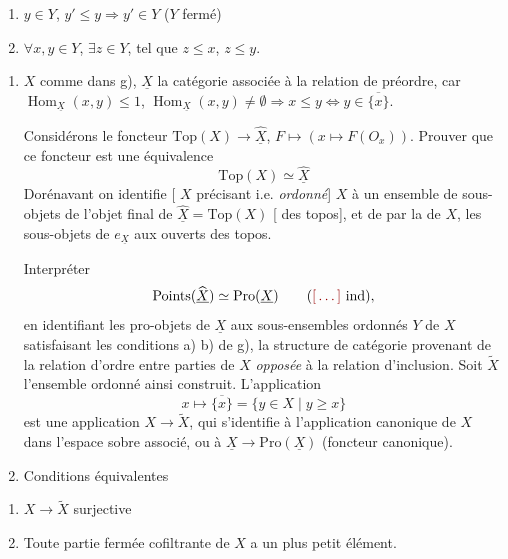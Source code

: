 \documentclass[11pt,a4paper]{article}
\begin{document}
\begin{enumerate}
\item[a)] $y \in Y$, $y' \leq y \Rightarrow y' \in Y$ \quad ($Y$ fermé)
\item[b)] $\forall x,y \in Y$, $\exists z \in Y$, tel que $z \leq x$, $z \leq y$.
\end{enumerate}


\begin{enumerate}
\item[h)] $X$ comme dans g), $\underline{X}$ la catégorie associée à la relation
de préordre, car $\operatorname{Hom}_{\underline{X}}(x,y) \leq 1$,
$\operatorname{Hom}_{\underline{X}}(x,y) \neq \emptyset \Rightarrow x \leq y
\iff y \in \overline{\{x\}}$.

Considérons le foncteur $\mathrm{Top}(X) \to \widehat{\underline{X}}$,
$F \mapsto (x \mapsto F(O_{x}))$. Prouver que ce foncteur est une équivalence
\[
\mathrm{Top}(X) \simeq \widehat{\underline{X}}
\]
Dorénavant on identifie [ $X$ précisant i.e. \emph{ordonné}] $X$ à un
ensemble de sous-objets de l'objet final de
$\widehat{\underline{X}} = \mathrm{Top}(X)$ [ \ill{} des topos],
et de \ill{} par la \ill{} de $X$, \ill{} les sous-objets de
$e_{\underline{X}}$ \ill{} aux ouverts des topos.

Interpréter
\[
\mathrm{Points}(\widehat{\underline{X}}) \simeq \mathrm{Pro}(\underline{X})
\qquad (\ill{}\ \mathrm{ind}),
\]
en identifiant les pro-objets de $\underline{X}$ aux sous-ensembles ordonnés $Y$
de $X$ satisfaisant les conditions a) b) de g),  la structure de
catégorie provenant de la relation d'ordre entre parties de $X$ \emph{opposée} à
la relation d'inclusion. Soit  $\widetilde{X}$
l'ensemble ordonné ainsi construit. L'application
\[
x \longmapsto \overline{\{x\}} = \{ y \in X \mid y \geq x \}
\]
est une application $X \to \widetilde{X}$, qui s'identifie à l'application
canonique de $X$ dans l'espace sobre associé, ou à
$\underline{X} \to \mathrm{Pro}(\underline{X})$ (foncteur canonique).

\item[i)] Conditions équivalentes
\end{enumerate}

\begin{enumerate}
\item[$\alpha$)] $X \to \widetilde{X}$ surjective
\item[$\beta$)] Toute partie fermée cofiltrante de $X$ a un plus petit élément.
\end{enumerate}
\end{document}
